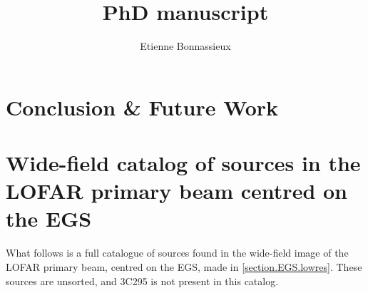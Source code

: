 \documentclass[11pt,a4paper,notitlepage]{book}
\author{Etienne Bonnassieux}
\title{PhD manuscript}
\makeatletter
\def\cleardoublepage{\clearpage\if@twoside \ifodd\c@page\else%
  \hbox{}%
  \thispagestyle{empty}%
  \newpage%
  \if@twocolumn\hbox{}\newpage\fi\fi\fi}
\makeatother
\begin{document}
\dominitoc
%

\maketitle
{}
%
%

\tableofcontents
\setcounter{page}{1}

 
\cleardoublepage



\cleardoublepage



\cleardoublepage



\cleardoublepage



\cleardoublepage



\cleardoublepage



\cleardoublepage




\cleardoublepage


\chapter{Conclusion \& Future Work}
\cleardoublepage
\minitoc



\cleardoublepage



\appendix
\chapter{Wide-field catalog of sources in the LOFAR primary beam centred on the EGS}\label{appendix.widefield.catalog}

\pg
What follows is a full catalogue of sources found in the wide-field image of the LOFAR primary beam, centred on the EGS, made in \cref{section.EGS.lowres}. These sources are unsorted, and 3C295 is not present in this catalog.

\end{document}

